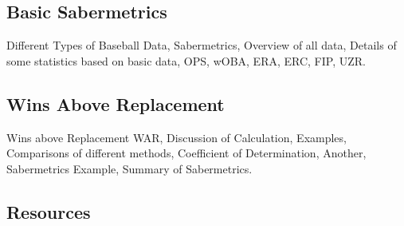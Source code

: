 

\subsection{Basic Sabermetrics}\label{basic-sabermetrics}

Different Types of Baseball Data, Sabermetrics, Overview of all data,
Details of some statistics based on basic data, OPS, wOBA, ERA, ERC,
FIP, UZR.





\subsection{Wins Above Replacement}\label{wins-above-replacement}

Wins above Replacement WAR, Discussion of Calculation, Examples,
Comparisons of different methods, Coefficient of Determination, Another,
Sabermetrics Example, Summary of Sabermetrics.






\subsection{Resources}\label{resources}

